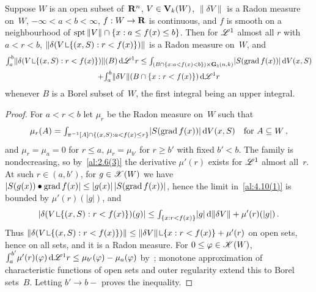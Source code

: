 \begin{theorem}
    \label{al:4.10(2)}
    Suppose $W$ is an open subset of~$\mathbf{R}^{n}$, $V \in \mathbf{V}_{k}(W)$, $\|\delta V\|$ is a
    Radon measure on~$W$, $-\infty < a < b < \infty$, $f : W \to \mathbf{R}$ is continuous, and $f$ is
    smooth on a neighbourhood of $\operatorname{spt} \|V\| \cap \{ x : a \le f(x) \le b \}$. Then for $\mathscr{L}^1$
    almost all $r$ with $a < r < b$, $\|\delta(V \restrict \{ (x,S) : r < f(x) \})\|$ is a Radon
    measure on~$W$, and
    \begin{multline*}
        \textint{a}{b} \|\delta(V \restrict \{ (x,S) : r < f(x) \})\|(B) \ud \LM^1 r \le
        \textint{(B \cap \{ x : a < f(x) < b \}) \times \pgrass{\adim}{\vdim}}{} |S(\grad f(x))| \ud
        V(x,S) \\ + \textint{a}{b} \|\delta V\|(B \cap \{ x : r < f(x) \}) \ud \LM^1 r
    \end{multline*}
    whenever $B$ is a Borel subset of~$W$, the first integral being an upper integral.
\end{theorem}

\begin{proof}
    For $a < r < b$ let $\mu_r$ be the Radon measure on~$W$ such that
    \begin{displaymath}
        \mu_r(A) = {\textstyle\int_{\pi^{-1}[A] \cap \{ (x,S) : a < f(x) \le r \}}^{}} |S(\operatorname{grad} f(x))| \,\mathrm{d}
        V(x,S) \quad \text{for $A \subseteq W$} \,,
    \end{displaymath}
    and $\mu_r = \mu_a = 0$ for $r \le a$, $\mu_r = \mu_{b'}$ for $r \ge b'$ with fixed $b' < b$. The
    family is nondecreasing, so by~\ref{al:2.6(3)} the derivative $\mu'(r)$ exists for $\mathscr{L}^1$
    almost all~$r$. At such $r \in (a,b')$, for $g \in \mathscr{X}(W)$ we have $|S(g(x)) \bullet \operatorname{grad}
    f(x)| \le |g(x)| \, |S(\operatorname{grad} f(x))|$, hence the limit in~\ref{al:4.10(1)} is bounded by
    $\mu'(r)(|g|)$, and
    \begin{displaymath}
        |\delta(V \restrict \{ (x,S) : r < f(x) \})(g)| \le \textint{\{ x : r < f(x) \}}{} |g| \ud
        \|\delta V\| + \mu'(r)(|g|) \,.
    \end{displaymath}
    Thus $\|\delta(V \restrict \{ (x,S) : r < f(x) \})\| \le \|\delta V\| \restrict \{ x : r <
    f(x) \} + \mu'(r)$ on open sets, hence on all sets, and it is a Radon measure. For $0 \le
    \varphi \in \mathscr{K}(W)$, ${\textstyle\int_{a}^{b'}} \mu'(r)(\varphi) \,\mathrm{d} \mathscr{L}^1 r \le \mu_{b'}(\varphi) -
    \mu_a(\varphi)$ by~\cite[2.9.19, 2.9.20]{Federer1969}; monotone approximation of
    characteristic functions of open sets and outer regularity extend this to Borel sets~$B$.
    Letting $b' \to b-$ proves the inequality.
\end{proof}

